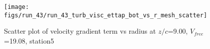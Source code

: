 \begin{figure}[H]
\centering
\texttt{[image: figs/run\_43/run\_43\_turb\_visc\_ettap\_bot\_vs\_r\_mesh\_scatter]}
\caption{Scatter plot of velocity gradient term vs radius at $z/c$=9.00, $V_{free}$=19.08, station5}
\label{fig:run_43_turb_visc_ettap_bot_vs_r_mesh_scatter}
\end{figure}



